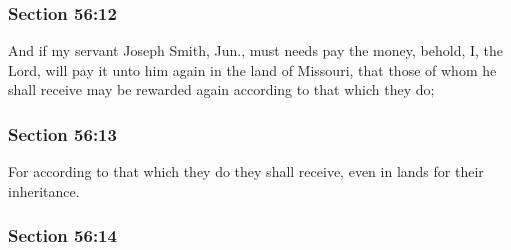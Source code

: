 	\subsubsection{Section 56:12} %
		\label{DC56-12}

		And if my servant Joseph Smith, Jun., must needs pay the money, behold, I, the Lord, will pay it unto him again in the land of Missouri, that those of whom he shall receive may be rewarded again according to that which they do;


	\subsubsection{Section 56:13} %
		\label{DC56-13}

		For according to that which they do they shall receive, even in lands for their inheritance.


	\subsubsection{Section 56:14} %
		\label{DC56-14}


